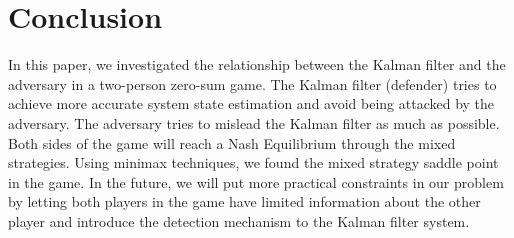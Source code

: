 \documentclass{article}
\begin{document}
\section{Conclusion}
In this paper, we investigated the relationship between the Kalman filter and the adversary in a two-person zero-sum game. The Kalman filter (defender) tries to achieve more accurate  system state estimation and avoid being attacked by the adversary. The adversary tries to mislead the Kalman filter as much as possible. Both sides of the game will reach a Nash Equilibrium through the mixed strategies. Using minimax techniques, we found  the mixed strategy saddle point in the game. In the future, we will put more practical constraints in our problem by letting both players in the game have limited information about the other player and introduce the detection mechanism to the Kalman filter system.



\end{document}
